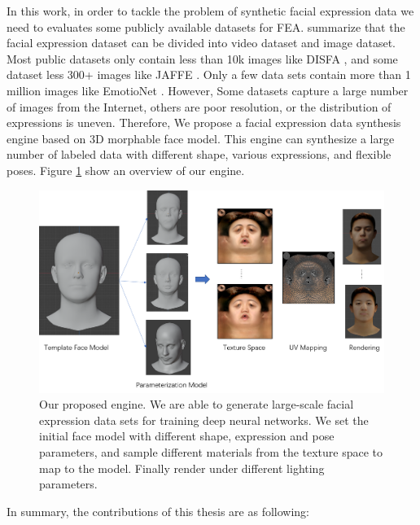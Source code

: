 In this work, in order to tackle the problem of synthetic facial expression data we need to evaluates some publicly available datasets for FEA. \citep{khanSurveyAnalysisHuman2020} summarize that the facial expression dataset can be divided into video dataset and image dataset. Most public datasets only contain less than 10k images like DISFA \citep{mavadatiDISFASpontaneousFacial2013} , and some dataset less 300+ images like JAFFE \citep{lyonsCodingFacialExpressions2020}. Only a few data sets contain more than 1 million images like EmotioNet \citep{benitez-quirozEmotioNetAccurateRealTime2016a}. However, Some datasets capture a large number of images from the Internet, others are poor resolution, or the distribution of expressions is uneven. Therefore, We propose a facial expression data synthesis engine based on 3D morphable face model. This engine can synthesize a large number of labeled data with different shape, various expressions, and flexible poses. Figure \ref{fig:overview} show an overview of our engine.

\begin{figure}
    \centering
    \includegraphics[width=\textwidth]{./figs/overview.png}
    \caption{Our proposed engine. We are able to generate large-scale facial expression data sets for training deep neural networks. We set the initial face model with different shape, expression and pose parameters, and sample different materials from the texture space to map to the model. Finally render under different lighting parameters.}
    \label{fig:overview}
\end{figure}

In summary, the contributions of this thesis are as following:

